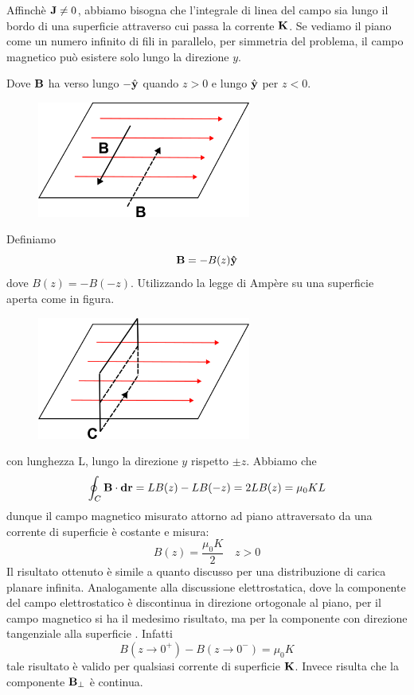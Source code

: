 \noindent Affinch\`e $\bold{J} \neq 0$, abbiamo bisogna che l'integrale di linea del campo sia lungo il bordo di una superficie attraverso cui passa la corrente $\bold{K}$. Se vediamo il piano come un numero infinito di fili in parallelo, per simmetria del problema, il campo magnetico pu\`o esistere solo lungo la direzione $y$. 

Dove $\bold{B}$ ha verso lungo $-\hat{\bold{y}}$ quando $z > 0$ e lungo $\hat{\bold{y}}$ per $z < 0$.
 \begin{figure}[!ht]
\vspace{0.1in}
\includegraphics[width = 7cm]{images/magnfieldplate}
\centering
\end{figure}

\noindent Definiamo
\begin{equation*}
	\bold{B} = - B(z) \bold{\hat{y}}
\end{equation*}
dove $B(z)=-B(-z)$. Utilizzando la legge di Amp\`ere su una superficie aperta come in figura.
 \begin{figure}[!ht]
\vspace{0.1in}
\includegraphics[width = 7cm]{images/planepath}
\centering
\end{figure}

\noindent con lunghezza L, lungo la direzione $y$ rispetto $\pm z$. Abbiamo che 
\begin{equation*}
	\oint_{C} \bold{B} \cdot \bold{dr} = LB(z) -LB(-z) = 2LB(z) = \mu_0 KL
\end{equation*}
dunque il campo magnetico misurato attorno ad piano attraversato da una corrente di superficie \`e costante e misura:
\begin{equation*}
	B(z) = \frac{\mu_0K}{2} \quad z>0
\end{equation*}
Il risultato ottenuto \`e simile a quanto discusso per una distribuzione di carica planare infinita. Analogamente alla discussione elettrostatica, dove la componente del campo elettrostatico \`e discontinua in direzione ortogonale al piano, per il campo magnetico si ha il medesimo risultato, ma per la componente con  direzione tangenziale alla superficie . Infatti
\begin{equation*}
	B(z \to 0^+) - B(z \to 0^-) = \mu_0K
\end{equation*}
tale risultato \`e valido per qualsiasi corrente di superficie $\bold{K}$. Invece risulta che la componente $\bold{B}_{\perp}$ \`e continua.

